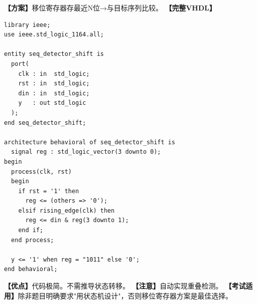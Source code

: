 \begin{detailbox}[完整教学]
\textbf{【方案】}移位寄存器存最近N位→与目标序列比较。
\textbf{【完整VHDL】}
\begin{lstlisting}[caption={移位寄存器+比较器实现1011序列检测}]
library ieee;
use ieee.std_logic_1164.all;

entity seq_detector_shift is
  port(
    clk : in  std_logic;
    rst : in  std_logic;
    din : in  std_logic;
    y   : out std_logic
  );
end seq_detector_shift;

architecture behavioral of seq_detector_shift is
  signal reg : std_logic_vector(3 downto 0);
begin
  process(clk, rst)
  begin
    if rst = '1' then
      reg <= (others => '0');
    elsif rising_edge(clk) then
      reg <= din & reg(3 downto 1);
    end if;
  end process;

  y <= '1' when reg = "1011" else '0';
end behavioral;
\end{lstlisting}
\textbf{【优点】}代码极简。不需推导状态转移。
\textbf{【注意】}自动实现重叠检测。
\textbf{【考试适用】}除非题目明确要求"用状态机设计"，否则移位寄存器方案是最佳选择。
\end{detailbox}
